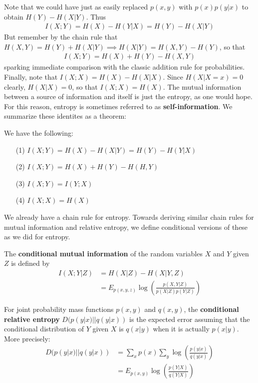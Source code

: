 Note that we could have just as easily replaced $p(x,y)$ with $p(x)p(y|x)$ to obtain $H(Y) - H(X|Y)$. Thus 
\begin{align}
	I(X;Y) = H(X) -H(Y|X) = H(Y)-H(X|Y)
\end{align}
But remember by the chain rule that $H(X,Y) = H(Y) + H(X|Y) \implies H(X|Y) = H(X,Y) - H(Y)$, so that 
\begin{align}
	I(X;Y) = H(X)+H(Y)-H(X,Y)
\end{align}
sparking immediate comparison with the classic addition rule for probabilities. 
Finally, note that $I(X;X) = H(X) - H(X|X)$. Since $H(X|X = x) = 0$ clearly, $H(X|X) = 0$, so that $I(X;X) = H(X)$. The mutual information between a source of information and itself is just the entropy, as one would hope. For this reason, entropy is sometimes referred to as \textbf{self-information}. We summarize these identites as a theorem:
\begin{theorem}
\end{theorem}
We have the following:
\begin{enumerate}
	\item[(1)] $I(X;Y) = H(X) - H(X|Y) = H(Y)-H(Y|X)$ 
	\item[(2)] $I(X;Y) = H(X) + H(Y) - H(H,Y)$ 
	\item[(3)] $I(X;Y) = I(Y;X)$ 
	\item[(4)] $I(X;X) = H(X)$
\end{enumerate}
We already have a chain rule for entropy. Towards deriving similar chain rules for mutual information and relative entropy, we define conditional versions of these as we did for entropy. 
\begin{definition}
	The \textbf{conditional mutual information} of the random variables $X$ and $Y$ given $Z$ is defined by 
	\begin{align}
		I(X;Y|Z) &= H(X|Z) - H(X|Y,Z) \\
			&= E_{p(x,y,z)} \log\left( \frac{p(X,Y|Z)}{p(X|Z)p(Y|Z)} \right)
	\end{align}
\end{definition}
\begin{definition}
	For joint probability mass functions $p(x,y)$ and $q(x,y)$, the \textbf{conditional relative entropy} $D(p(y|x)||q(y|x))$ is the expected error assuming that the conditional distribution of $Y$ given $X$ is $q(x|y)$ when it is actually $p(x|y)$. More precisely:
	\begin{align}
		D(p(y|x)||q(y|x)) &= \sum_x p(x) \sum_y \log\left( \frac{p(y|x)}{q(y|x)} \right) \\
		&= E_{p(x,y)} \log\left( \frac{p(Y|X)}{q(Y|X)} \right)
	\end{align}
\end{definition}

